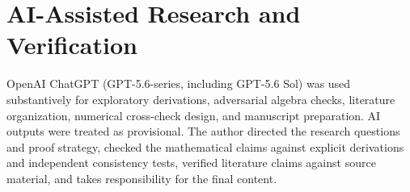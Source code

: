 \documentclass[aps,pra,reprint,superscriptaddress,longbibliography]{revtex4-2}
\begin{document}
\section*{AI-Assisted Research and Verification}

OpenAI ChatGPT (GPT-5.6-series, including GPT-5.6 Sol) was used substantively for exploratory derivations, adversarial algebra checks, literature organization, numerical cross-check design, and manuscript preparation. AI outputs were treated as provisional. The author directed the research questions and proof strategy, checked the mathematical claims against explicit derivations and independent consistency tests, verified literature claims against source material, and takes responsibility for the final content.


\end{document}
